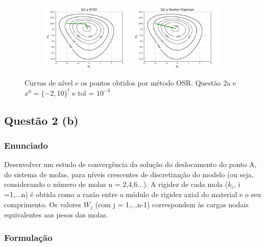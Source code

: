 \documentclass[10pt, a4paper]{article}
\begin{document}
\begin{figure}[H]
\begin{subfigure}[b]{\textwidth}
  \end{subfigure}
  \begin{subfigure}[b]{\textwidth}
    \includegraphics[width=0.49\textwidth]{figuras/Q2.a_BFGS_P0=[-2 10].pdf}
    \includegraphics[width=0.49\textwidth]{figuras/Q2.a_Newton Raphson_P0=[-2 10].pdf}
  \end{subfigure}
  \caption{Curvas de nível e os pontos obtidos por método OSR. Questão 2a e $x^0 = \{-2,10\}^t$ e tol = $10^{-3}$}
\end{figure}

\subsection{Questão 2 (b)}
\subsubsection{Enunciado}
Desenvolver um estudo de convergência da solução do deslocamento do ponto A, do sistema de molas, para níveis crescentes
de discretização do modelo (ou seja, considerando o número de molas n = 2,4,6...). A rigidez de cada mola ($k_i$, i =1,...n)
é obtida como a razão entre o módulo de rigidez axial do material e o seu comprimento. Os valores $W_j$ (com j = 1,...n-1)
correspondem às cargas nodais equivalentes aos pesos das molas.

\subsubsection{Formulação}
\end{document}
